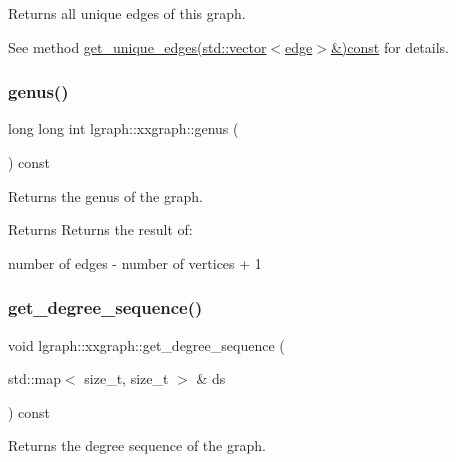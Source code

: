 Returns all unique edges of this graph. 

See method \hyperlink{classlgraph_1_1uxgraph_a5a014396ad3bd800028be641c140e5a0}{get\+\_\+unique\+\_\+edges(std\+::vector$<$edge$>$\&)const} for details. \mbox{\label{classlgraph_1_1xxgraph_a5f48a91046766e3e0b71a3326f2b9153}} 
\subsubsection{\texorpdfstring{genus()}{genus()}}
{\footnotesize\ttfamily long long int lgraph\+::xxgraph\+::genus (\begin{DoxyParamCaption}{ }\end{DoxyParamCaption}) const\hspace{0.3cm}{\ttfamily [inherited]}}



Returns the genus of the graph. 

\begin{DoxyReturn}{Returns}
Returns the result of\+: \begin{DoxyVerb}number of edges - number of vertices + 1
\end{DoxyVerb}
 
\end{DoxyReturn}
\mbox{\label{classlgraph_1_1xxgraph_a5b21b51f5f9c55c05c0e8e5bc836bf87}} 
\subsubsection{\texorpdfstring{get\+\_\+degree\+\_\+sequence()}{get\_degree\_sequence()}}
{\footnotesize\ttfamily void lgraph\+::xxgraph\+::get\+\_\+degree\+\_\+sequence (\begin{DoxyParamCaption}\item[{std\+::map$<$ size\+\_\+t, size\+\_\+t $>$ \&}]{ds }\end{DoxyParamCaption}) const\hspace{0.3cm}{\ttfamily [inherited]}}



Returns the degree sequence of the graph. 


